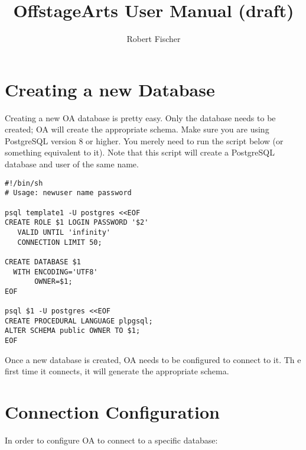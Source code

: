 \documentclass[11pt]{article}
\title{OffstageArts User Manual (draft)}
\author{Robert Fischer}
\begin{document}
\maketitle

\section{Creating a new Database}

Creating a new OA database is pretty easy.  Only the database needs to be created; OA will create the appropriate schema.  Make sure you are using PostgreSQL version 8 or higher.  You merely need to run the script below (or something equivalent to it).  Note that this script will create a PostgreSQL database and user of the same name.

\begin{verbatim}
#!/bin/sh
# Usage: newuser name password

psql template1 -U postgres <<EOF
CREATE ROLE $1 LOGIN PASSWORD '$2'
   VALID UNTIL 'infinity'
   CONNECTION LIMIT 50;

CREATE DATABASE $1
  WITH ENCODING='UTF8'
       OWNER=$1;
EOF

psql $1 -U postgres <<EOF
CREATE PROCEDURAL LANGUAGE plpgsql;
ALTER SCHEMA public OWNER TO $1;
EOF
\end{verbatim}

Once a new database is created, OA needs to be configured to connect to it.  Th e first time it connects, it will generate the appropriate schema.

\section{Connection Configuration}

In order to configure OA to connect to a specific database:
\end{document}
